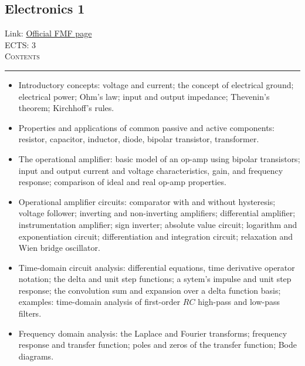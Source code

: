 \documentclass[11pt, a4paper]{article}
\newenvironment{course}[3]{
\subsection{#1}%
Link: \href{#2}{Official FMF page}\\%
ECTS: #3%
\vspace{1ex}
\\
{\large \textsc{Contents}}\\[-0.9ex]%
\rule{\textwidth}{0.5pt}
\vspace{-3ex}
}
{}
\newenvironment{chapter}[1]{
\begin{tcolorbox}[title=#1, breakable]
}
{\end{tcolorbox}}
\begin{document}
\begin{course}{Electronics 1}{https://www.fmf.uni-lj.si/en/study-physics/programmes/1fiz/2020/7000777/courses/1134/}{3}
    \label{electronics-1}

    \begin{chapter}{Analog electric circuits}
        \begin{itemize}

            \item Introductory concepts: voltage and current; the concept of electrical ground; electrical power; Ohm's law; input and output impedance; Thevenin's theorem; Kirchhoff's rules.

            \item Properties and applications of common passive and active components: resistor, capacitor, inductor, diode, bipolar transistor, transformer.

            \item The operational amplifier: basic model of an op-amp using bipolar transistors; input and output current and voltage characteristics, gain, and frequency response; comparison of ideal and real op-amp properties.

            \item Operational amplifier circuits: comparator with and without hysteresis; voltage follower; inverting and non-inverting amplifiers; differential amplifier; instrumentation amplifier; sign inverter; absolute value circuit; logarithm and exponentiation circuit; differentiation and integration circuit; relaxation and Wien bridge oscillator.

        \end{itemize}
    \end{chapter}

    \begin{chapter}{Circuit analysis}
        \begin{itemize}
        
            \item Time-domain circuit analysis: differential equations, time derivative operator notation; the delta and unit step functions; a sytem's impulse and unit step response; the convolution sum and expansion over a delta function basis; examples: time-domain analysis of first-order $ RC $ high-pass and low-pass filters.

            \item Frequency domain analysis: the Laplace and Fourier transforms; frequency response and transfer function; poles and zeros of the transfer function; Bode diagrams.


\end{itemize}
\end{chapter}
\end{course}
\end{document}
